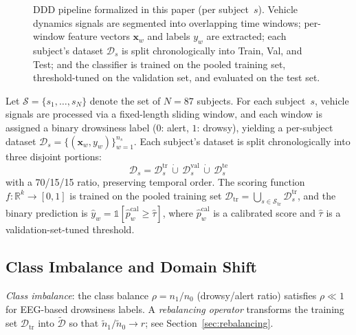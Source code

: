 \documentclass[lettersize,journal]{IEEEtran}
\begin{document}
\begin{figure}[!t]
\centering
\resizebox{\columnwidth}{!}{}
\caption{DDD pipeline formalized in this paper (per subject~$s$). Vehicle dynamics signals are segmented into overlapping time windows; per-window feature vectors $\mathbf{x}_w$ and labels $y_w$ are extracted; each subject's dataset $\mathcal{D}_s$ is split chronologically into Train, Val, and Test; and the classifier is trained on the pooled training set, threshold-tuned on the validation set, and evaluated on the test set.}
\label{fig:framework_ddd_flow}
\end{figure}

Let $\mathcal{S} = \{s_1, \ldots, s_N\}$ denote the set of $N = 87$ subjects.
For each subject~$s$, vehicle signals are processed via a fixed-length sliding window, and each window is assigned a binary drowsiness label ($0$: alert, $1$: drowsy), yielding a per-subject dataset $\mathcal{D}_s = \{(\mathbf{x}_w, y_w)\}_{w=1}^{n_s}$.
Each subject's dataset is split chronologically into three disjoint portions:
\begin{equation}
\label{eq:split}
\mathcal{D}_s = \mathcal{D}_s^{\mathrm{tr}} \,\dot{\cup}\, \mathcal{D}_s^{\mathrm{val}} \,\dot{\cup}\, \mathcal{D}_s^{\mathrm{te}}
\end{equation}
with a 70/15/15 ratio, preserving temporal order.
The scoring function $f\colon \mathbb{R}^k \to [0,1]$ is trained on the pooled training set $\mathcal{D}_{\mathrm{tr}} = \bigcup_{s \in \mathcal{S}_{\mathrm{tr}}} \mathcal{D}_s^{\mathrm{tr}}$, and the binary prediction is $\hat{y}_w = \mathbb{1}[\hat{p}_w^{\mathrm{cal}} \geq \hat{\tau}]$, where $\hat{p}_w^{\mathrm{cal}}$ is a calibrated score and $\hat{\tau}$ is a validation-set-tuned threshold.

\subsection{Class Imbalance and Domain Shift}
\emph{Class imbalance}: the class balance $\rho = n_1/n_0$ (drowsy/alert ratio) satisfies $\rho \ll 1$ for EEG-based drowsiness labels.
A \emph{rebalancing operator} transforms the training set $\mathcal{D}_{\mathrm{tr}}$ into $\tilde{\mathcal{D}}$ so that $\tilde{n}_1/\tilde{n}_0 \to r$; see Section~\ref{sec:rebalancing}.
\end{document}
